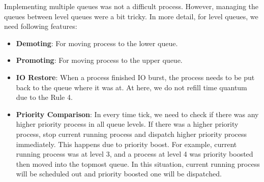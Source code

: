 \documentclass{homework}
\begin{document}
Implementing multiple queues was not a difficult process. However, managing the queues between level queues were a bit tricky. In more detail, for level queues, we need following features:
\begin{itemize}
    \item \textbf{Demoting}: For moving process to the lower queue.
    \item \textbf{Promoting}: For moving process to the upper queue.
    \item \textbf{IO Restore}: When a process finished IO burst, the process needs to be put back to the queue where it was at. At here, we do not refill time quantum due to the Rule 4. 
    \item \textbf{Priority Comparison}: In every time tick, we need to check if there was any higher priority process in all queue levels. If there was a higher priority process, stop current running process and dispatch higher priority process immediately. This happens due to priority boost. For example, current running process was at level 3, and a process at level 4 was priority boosted then moved into the topmost queue. In this situation, current running process will be scheduled out and priority boosted one will be dispatched.
\end{itemize}
\end{document}
